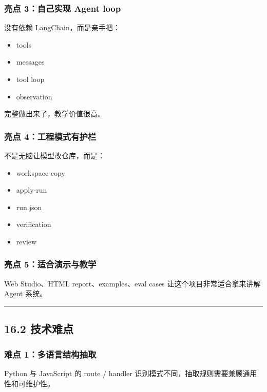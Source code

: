 \documentclass[UTF8,12pt,openany]{ctexbook}
\begin{document}
\subsubsection{亮点 3：自己实现 Agent loop}

没有依赖 LangChain，而是亲手把：\par

\begin{itemize}
\item tools
\item messages
\item tool loop
\item observation
\end{itemize}

完整做出来了，教学价值很高。\par

\subsubsection{亮点 4：工程模式有护栏}

不是无脑让模型改仓库，而是：\par

\begin{itemize}
\item workspace copy
\item apply-run
\item run.json
\item verification
\item review
\end{itemize}

\subsubsection{亮点 5：适合演示与教学}

Web Studio、HTML report、examples、eval cases 让这个项目非常适合拿来讲解 Agent 系统。\par

\hrule

\subsection{16.2 技术难点}

\subsubsection{难点 1：多语言结构抽取}

Python 与 JavaScript 的 route / handler 识别模式不同，抽取规则需要兼顾通用性和可维护性。\par
\end{document}
